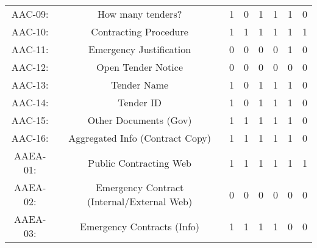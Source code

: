 \documentclass[a4paper, twoside]{report}
\begin{document}
\begin{table}[htbp]
\begin{adjustbox}{max width=\linewidth}
\begin{tabular}{rccccccc}
    \multicolumn{1}{c}{AAC-09:} & \multicolumn{1}{p{19em}}{How many tenders?} & 1     & 0     & 1     & 1     & 1     & 0 \\
    \multicolumn{1}{c}{AAC-10:} & \multicolumn{1}{p{19em}}{\cellcolor[rgb]{ .749,  .749,  .749}Contracting Procedure} & \cellcolor[rgb]{ .749,  .749,  .749}1 & \cellcolor[rgb]{ .749,  .749,  .749}1 & \cellcolor[rgb]{ .749,  .749,  .749}1 & \cellcolor[rgb]{ .749,  .749,  .749}1 & \cellcolor[rgb]{ .749,  .749,  .749}1 & \cellcolor[rgb]{ .749,  .749,  .749}1 \\
    \multicolumn{1}{c}{AAC-11:} & \multicolumn{1}{p{19em}}{\cellcolor[rgb]{ .749,  .749,  .749}Emergency Justification} & \cellcolor[rgb]{ .749,  .749,  .749}0 & \cellcolor[rgb]{ .749,  .749,  .749}0 & \cellcolor[rgb]{ .749,  .749,  .749}0 & \cellcolor[rgb]{ .749,  .749,  .749}0 & \cellcolor[rgb]{ .749,  .749,  .749}1 & \cellcolor[rgb]{ .749,  .749,  .749}0 \\
    \multicolumn{1}{c}{AAC-12:} & \multicolumn{1}{p{19em}}{Open Tender Notice} & 0     & 0     & 0     & 0     & 0     & 0 \\
    \multicolumn{1}{c}{AAC-13:} & \multicolumn{1}{p{19em}}{Tender Name} & 1     & 0     & 1     & 1     & 1     & 0 \\
    \multicolumn{1}{c}{AAC-14:} & \multicolumn{1}{p{19em}}{Tender ID} & 1     & 0     & 1     & 1     & 1     & 0 \\
    \multicolumn{1}{c}{AAC-15:} & \multicolumn{1}{p{19em}}{Other Documents (Gov)} & 1     & 1     & 1     & 1     & 1     & 0 \\
    \multicolumn{1}{c}{AAC-16:} & \multicolumn{1}{p{19em}}{Aggregated Info (Contract Copy)} & 1     & 1     & 1     & 1     & 1     & 0 \\
    \midrule
    \multicolumn{1}{c}{AAEA-01:} & \multicolumn{1}{p{19em}}{Public Contracting Web} & 1     & 1     & 1     & 1     & 1     & 1 \\
    \multicolumn{1}{c}{AAEA-02:} & \multicolumn{1}{p{19em}}{\cellcolor[rgb]{ .749,  .749,  .749}Emergency Contract (Internal/External Web)} & \cellcolor[rgb]{ .749,  .749,  .749}0 & \cellcolor[rgb]{ .749,  .749,  .749}0 & \cellcolor[rgb]{ .749,  .749,  .749}0 & \cellcolor[rgb]{ .749,  .749,  .749}0 & \cellcolor[rgb]{ .749,  .749,  .749}0 & \cellcolor[rgb]{ .749,  .749,  .749}0 \\
    \multicolumn{1}{c}{AAEA-03:} & \multicolumn{1}{p{19em}}{\cellcolor[rgb]{ .749,  .749,  .749}Emergency Contracts (Info)} & \cellcolor[rgb]{ .749,  .749,  .749}1 & \cellcolor[rgb]{ .749,  .749,  .749}1 & \cellcolor[rgb]{ .749,  .749,  .749}1 & \cellcolor[rgb]{ .749,  .749,  .749}1 & \cellcolor[rgb]{ .749,  .749,  .749}0 & \cellcolor[rgb]{ .749,  .749,  .749}0 \\

\end{tabular}
\end{adjustbox}
\end{table}
\end{document}

